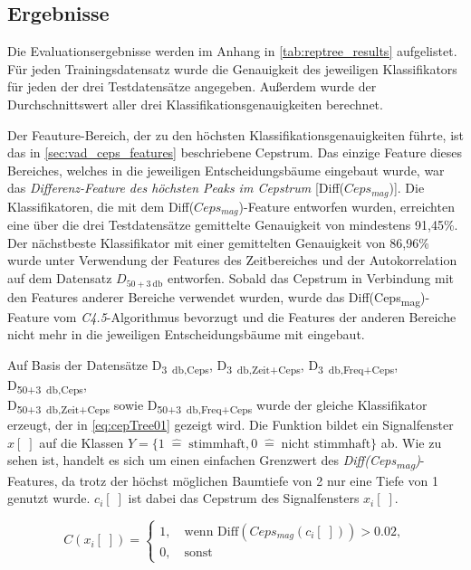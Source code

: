\subsection{Ergebnisse}
\label{sec:vad_results}

Die Evaluationsergebnisse werden im Anhang in \autoref{tab:reptree_results} aufgelistet. Für jeden Trainingsdatensatz wurde die Genauigkeit des jeweiligen Klassifikators für jeden der drei Testdatensätze angegeben. Außerdem wurde der Durchschnittswert aller drei Klassifikationsgenauigkeiten berechnet.

Der Feauture-Bereich, der zu den höchsten Klassifikationsgenauigkeiten führte, ist das in \autoref{sec:vad_ceps_features} beschriebene Cepstrum. Das einzige Feature dieses Bereiches, welches in die jeweiligen Entscheidungsbäume eingebaut wurde, war das \emph{Differenz-Feature des höchsten Peaks im Cepstrum} [Diff($Ceps_{mag}$)]. Die Klassifikatoren, die mit dem Diff($Ceps_{mag}$)-Feature entworfen wurden, erreichten eine über die drei Testdatensätze gemittelte Genauigkeit von mindestens 91,45\%. Der nächstbeste Klassifikator mit einer gemittelten Genauigkeit von 86,96\% wurde unter Verwendung der Features des Zeitbereiches und der Autokorrelation auf dem Datensatz $D_{50+\SI{3}{\decibel}}$ entworfen. Sobald das Cepstrum in Verbindung mit den Features anderer Bereiche verwendet wurden, wurde das Diff(Ceps\textsubscript{mag})-Feature vom \emph{C4.5}-Algorithmus bevorzugt und die Features der anderen Bereiche nicht mehr in die jeweiligen Entscheidungsbäume mit eingebaut.

Auf Basis der Datensätze D\textsubscript{\SI{3}{\decibel},Ceps}, D\textsubscript{\SI{3}{\decibel},Zeit+Ceps}, D\textsubscript{\SI{3}{\decibel},Freq+Ceps}, D\textsubscript{50+\SI{3}{\decibel},Ceps}, \\ D\textsubscript{50+\SI{3}{\decibel},Zeit+Ceps} sowie D\textsubscript{50+\SI{3}{\decibel},Freq+Ceps} wurde der gleiche Klassifikator erzeugt, der in \autoref{eq:cepTree01} gezeigt wird. Die Funktion bildet ein Signalfenster $x[\;]$ auf die Klassen $Y = \{ 1 \; \hat{=} \; \text{stimmhaft}, 0 \; \hat{=} \; \text{nicht stimmhaft}\}$ ab. Wie zu sehen ist, handelt es sich um einen einfachen Grenzwert des \emph{Diff(Ceps\textsubscript{mag})}-Features, da trotz der höchst möglichen Baumtiefe von 2 nur eine Tiefe von 1 genutzt wurde. $c_i[\;]$ ist dabei das Cepstrum des Signalfensters $x_i[\;]$.

\begin{equation}
C(x_i[\;]) = \begin{cases}
1, \quad \text{wenn  Diff}(Ceps_{mag}(c_i[\;])) > 0.02, \\
0, \quad \text{sonst}
\end{cases}
\label{eq:cepTree01}
\end{equation}


